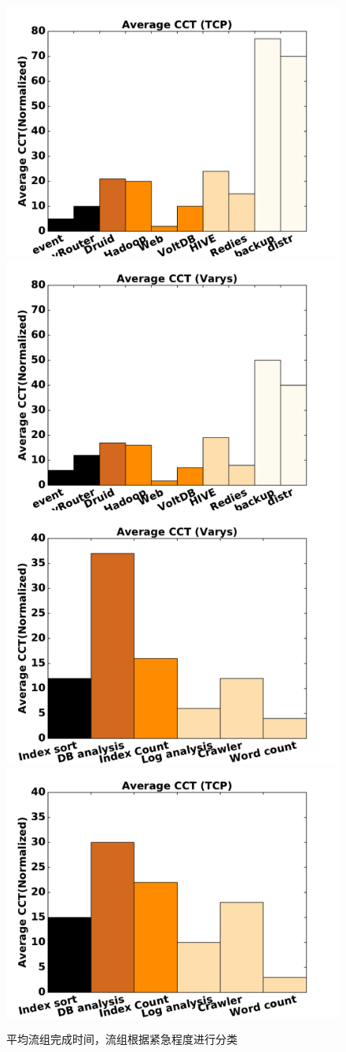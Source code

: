 \begin{figure}[h]
\setlength{\abovecaptionskip}{0pt} 
\setlength{\belowcaptionskip}{1pt} 
  \centering%
    {\includegraphics[width=0.5\columnwidth]{figures/Yosemite/figs/motivation/motivationnew_1.pdf}}%
      {\includegraphics[width=0.5\columnwidth]{figures/Yosemite/figs/motivation/motivationnew_2.pdf}}
    {\includegraphics[width=0.5\columnwidth]{figures/Yosemite/figs/motivation/motivationnew_3.pdf}}%
      {\includegraphics[width=0.5\columnwidth]{figures/Yosemite/figs/motivation/motivationnew_4.pdf}}
  \caption{平均流组完成时间，流组根据紧急程度进行分类}
  \label{Yosemite_Motivation_fig1}
\end{figure}


